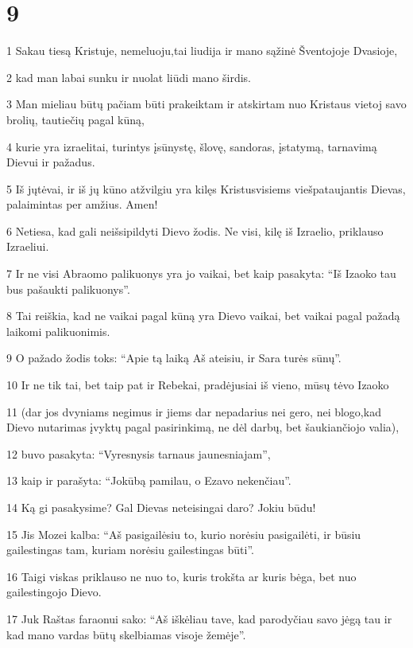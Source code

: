\chapter{9}


\par 1 Sakau tiesą Kristuje, nemeluoju,­tai liudija ir mano sąžinė Šventojoje Dvasioje, 
\par 2 kad man labai sunku ir nuolat liūdi mano širdis. 
\par 3 Man mieliau būtų pačiam būti prakeiktam ir atskirtam nuo Kristaus vietoj savo brolių, tautiečių pagal kūną, 
\par 4 kurie yra izraelitai, turintys įsūnystę, šlovę, sandoras, įstatymą, tarnavimą Dievui ir pažadus. 
\par 5 Iš jų­tėvai, ir iš jų kūno atžvilgiu yra kilęs Kristus­visiems viešpataujantis Dievas, palaimintas per amžius. Amen! 
\par 6 Netiesa, kad gali neišsipildyti Dievo žodis. Ne visi, kilę iš Izraelio, priklauso Izraeliui. 
\par 7 Ir ne visi Abraomo palikuonys yra jo vaikai, bet kaip pasakyta: “Iš Izaoko tau bus pašaukti palikuonys”. 
\par 8 Tai reiškia, kad ne vaikai pagal kūną yra Dievo vaikai, bet vaikai pagal pažadą laikomi palikuonimis. 
\par 9 O pažado žodis toks: “Apie tą laiką Aš ateisiu, ir Sara turės sūnų”. 
\par 10 Ir ne tik tai, bet taip pat ir Rebekai, pradėjusiai iš vieno, mūsų tėvo Izaoko 
\par 11 (dar jos dvyniams negimus ir jiems dar nepadarius nei gero, nei blogo,­kad Dievo nutarimas įvyktų pagal pasirinkimą, ne dėl darbų, bet šaukiančiojo valia), 
\par 12 buvo pasakyta: “Vyresnysis tarnaus jaunesniajam”, 
\par 13 kaip ir parašyta: “Jokūbą pamilau, o Ezavo nekenčiau”. 
\par 14 Ką gi pasakysime? Gal Dievas neteisingai daro? Jokiu būdu! 
\par 15 Jis Mozei kalba: “Aš pasigailėsiu to, kurio norėsiu pasigailėti, ir būsiu gailestingas tam, kuriam norėsiu gailestingas būti”. 
\par 16 Taigi viskas priklauso ne nuo to, kuris trokšta ar kuris bėga, bet nuo gailestingojo Dievo. 
\par 17 Juk Raštas faraonui sako: “Aš iškėliau tave, kad parodyčiau savo jėgą tau ir kad mano vardas būtų skelbiamas visoje žemėje”. 
